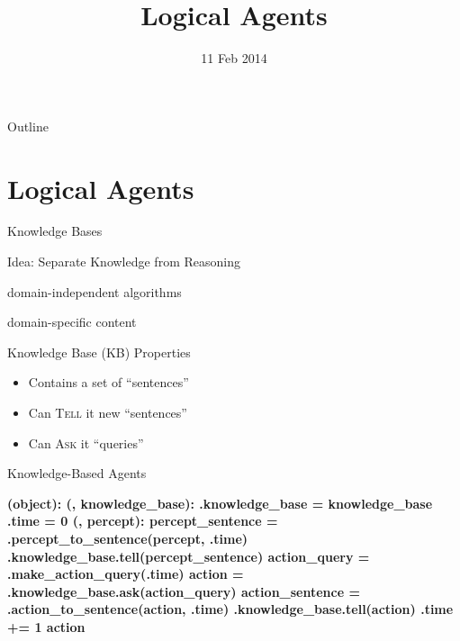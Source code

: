 \documentclass[14pt]{beamer}
\title{Logical Agents}
\date{11 Feb 2014}
\begin{document}
\begin{frame}
  \titlepage
\end{frame}


\begin{frame}{Outline}
  \tableofcontents
\end{frame}


\section{Logical Agents}

\begin{frame}{Knowledge Bases}
\begin{block}{Idea: Separate Knowledge from Reasoning}
\begin{description}
\item[Inference Engine:] domain-independent algorithms
\item[Knowledge Base:] domain-specific content
\end{description}
\end{block}
\pause
\begin{block}{Knowledge Base (KB) Properties}
\begin{itemize}
\item Contains a set of ``sentences''
\item Can \textsc{Tell} it new ``sentences''
\item Can \textsc{Ask} it ``queries''
\end{itemize}
\end{block}
\end{frame}
\begin{frame}[fragile]{Knowledge-Based Agents}
	\begin{semiverbatim}\bfseries\scriptsize
		 (object):\pause
		     (, knowledge_base):
		        .knowledge_base = knowledge_base
		        .time = 0
		     (, percept):
		        \pause{}
		        percept_sentence = .percept_to_sentence(percept, .time)
		        .knowledge_base.tell(percept_sentence)
		        \pause{}
		        action_query = .make_action_query(.time)
		        action = .knowledge_base.ask(action_query)
		        \pause{}
		        action_sentence = .action_to_sentence(action, .time)
		        .knowledge_base.tell(action)
		        .time += 1
		        \pause{}
		         action
	\end{semiverbatim}
\end{frame}
\end{document}
